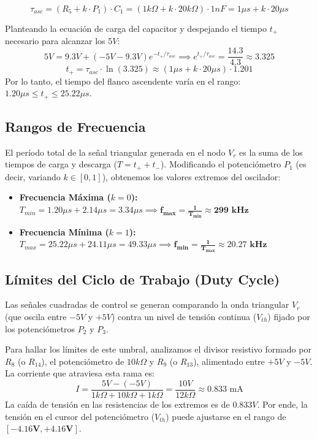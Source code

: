 \begin{equation}
	\tau_{asc} = (R_5 + k \cdot P_1) \cdot C_1 = (1k\Omega + k \cdot 20k\Omega) \cdot 1nF = 1\mu s + k \cdot 20\mu s
\end{equation}

Planteando la ecuación de carga del capacitor y despejando el tiempo $t_+$ necesario para alcanzar los $5V$:
\begin{equation}
	5V = 9.3V + (-5V - 9.3V)e^{-t_+/\tau_{asc}} \implies e^{t_+/\tau_{asc}} = \frac{14.3}{4.3} \approx 3.325
\end{equation}
\begin{equation}
	t_+ = \tau_{asc} \cdot \ln(3.325) \approx (1\mu s + k \cdot 20\mu s) \cdot 1.201
\end{equation}
Por lo tanto, el tiempo del flanco ascendente varía en el rango: $1.20\mu s \le t_+ \le 25.22\mu s$.

\subsection{Rangos de Frecuencia}
El período total de la señal triangular generada en el nodo $V_r$ es la suma de los tiempos de carga y descarga ($T = t_+ + t_-$). Modificando el potenciómetro $P_1$ (es decir, variando $k \in [0, 1]$), obtenemos los valores extremos del oscilador:

\begin{itemize}
	\item \textbf{Frecuencia Máxima ($k=0$):} \\
	$T_{min} = 1.20\mu s + 2.14\mu s = 3.34\mu s \implies \mathbf{f_{max} = \frac{1}{T_{min}} \approx 299 \text{ kHz}}$
	\item \textbf{Frecuencia Mínima ($k=1$):} \\
	$T_{max} = 25.22\mu s + 24.11\mu s = 49.33\mu s \implies \mathbf{f_{min} = \frac{1}{T_{max}} \approx 20.27 \text{ kHz}}$
\end{itemize}

\subsection{Límites del Ciclo de Trabajo (Duty Cycle)}
Las señales cuadradas de control se generan comparando la onda triangular $V_r$ (que oscila entre $-5V$ y $+5V$) contra un nivel de tensión continua ($V_{th}$) fijado por los potenciómetros $P_2$ y $P_3$.

Para hallar los límites de este umbral, analizamos el divisor resistivo formado por $R_8$ (o $R_{14}$), el potenciómetro de $10k\Omega$ y $R_9$ (o $R_{13}$), alimentado entre $+5V$ y $-5V$. La corriente que atraviesa esta rama es:
\begin{equation}
	I = \frac{5V - (-5V)}{1k\Omega + 10k\Omega + 1k\Omega} = \frac{10V}{12k\Omega} \approx 0.833 \text{ mA}
\end{equation}
La caída de tensión en las resistencias de los extremos es de $0.833V$. Por ende, la tensión en el cursor del potenciómetro ($V_{th}$) puede ajustarse en el rango de $\mathbf{[-4.16V, +4.16V]}$.

